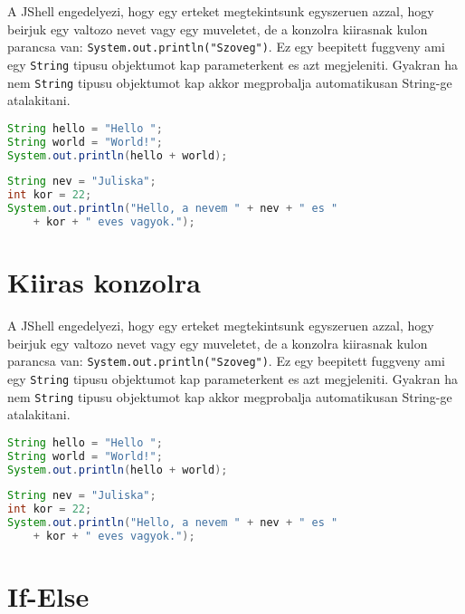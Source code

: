 \documentclass{article}
\begin{document}
A JShell engedelyezi, hogy egy erteket megtekintsunk egyszeruen azzal, hogy beirjuk egy valtozo nevet vagy egy muveletet, de a konzolra kiirasnak kulon parancsa van: \lstinline{System.out.println("Szoveg")}.
Ez egy beepitett fuggveny ami egy \lstinline{String} tipusu objektumot kap parameterkent es azt megjeleniti. Gyakran ha nem \lstinline{String} tipusu objektumot kap akkor megprobalja automatikusan String-ge atalakitani.

\begin{lstlisting}[language=Java, caption=Konzolra kiiras 1.]
String hello = "Hello ";
String world = "World!";
System.out.println(hello + world);
\end{lstlisting}

\begin{lstlisting}[language=Java, caption=Konzolra kiiras 2.]
String nev = "Juliska";
int kor = 22;
System.out.println("Hello, a nevem " + nev + " es "
    + kor + " eves vagyok.");
\end{lstlisting}

\newpage

\section{Kiiras konzolra}

A JShell engedelyezi, hogy egy erteket megtekintsunk egyszeruen azzal, hogy beirjuk egy valtozo nevet vagy egy muveletet, de a konzolra kiirasnak kulon parancsa van: \lstinline{System.out.println("Szoveg")}.
Ez egy beepitett fuggveny ami egy \lstinline{String} tipusu objektumot kap parameterkent es azt megjeleniti. Gyakran ha nem \lstinline{String} tipusu objektumot kap akkor megprobalja automatikusan String-ge atalakitani.

\begin{lstlisting}[language=Java, caption=Konzolra kiiras 1.]
String hello = "Hello ";
String world = "World!";
System.out.println(hello + world);
\end{lstlisting}

\begin{lstlisting}[language=Java, caption=Konzolra kiiras 2.]
String nev = "Juliska";
int kor = 22;
System.out.println("Hello, a nevem " + nev + " es "
    + kor + " eves vagyok.");
\end{lstlisting}

\newpage

\section{If-Else}
\end{document}
